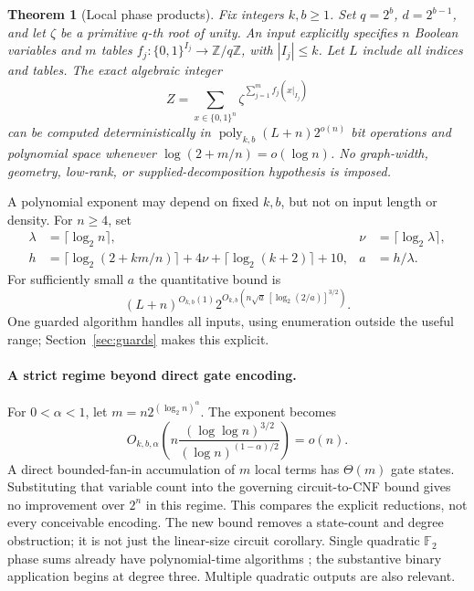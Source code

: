 \documentclass[11pt,a4paper]{article}
\newtheorem{theorem}{Theorem}[section]
\theoremstyle{remark}\newtheorem{remark}[theorem]{Remark}
\newcommand{\F}{\mathbb F}\newcommand{\Q}{\mathbb Q}\newcommand{\Z}{\mathbb Z}
\newcommand{\bits}{\{0,1\}}\newcommand{\poly}{\operatorname{poly}}
\begin{document}
\begin{theorem}[Local phase products]\label{thm:main}
Fix integers $k,b\ge1$. Set $q=2^b$, $d=2^{b-1}$, and let $\zeta$ be a
primitive $q$-th root of unity. An input explicitly specifies $n$ Boolean
variables and $m$ tables $f_j:\bits^{I_j}\to\Z/q\Z$, with $|I_j|\le k$.
Let $L$ include all indices and tables. The exact algebraic integer
\[
 Z=\sum_{x\in\bits^n}\zeta^{\sum_{j=1}^m f_j(x|_{I_j})}
\]
can be computed deterministically in $\poly_{k,b}(L+n)2^{o(n)}$ bit
operations and polynomial space whenever
$\log(2+m/n)=o(\log n)$.
No graph-width, geometry, low-rank, or supplied-decomposition hypothesis
is imposed.
\end{theorem}

A polynomial exponent may depend on fixed $k,b$, but not on input
length or density. For $n\ge4$, set
\begin{align*}
 \lambda&=\lceil\log_2n\rceil,&\nu&=\lceil\log_2\lambda\rceil,\\
 h&=\lceil\log_2(2+km/n)\rceil+4\nu+\lceil\log_2(k+2)\rceil+10,
 &a&=h/\lambda.
\end{align*}
For sufficiently small $a$ the quantitative bound is
\begin{equation}\label{eq:time}
 (L+n)^{O_{k,b}(1)}
 2^{O_{k,b}\left(n\sqrt a\,[\log_2(2/a)]^{3/2}\right)}.
\end{equation}
One guarded algorithm handles all inputs, using enumeration outside the
useful range; Section~\ref{sec:guards} makes this explicit.

\paragraph{A strict regime beyond direct gate encoding.}
For $0<\alpha<1$, let $m=n2^{(\log_2n)^\alpha}$. The exponent becomes
\[
 O_{k,b,\alpha}\!\left(
 n\frac{(\log\log n)^{3/2}}{(\log n)^{(1-\alpha)/2}}\right)=o(n).
\]
A direct bounded-fan-in accumulation of $m$ local terms has
$\Theta(m)$ gate states. Substituting that variable count into the
governing circuit-to-CNF bound gives no improvement over $2^n$ in this
regime. This compares the explicit reductions, not every conceivable
encoding. The new bound removes a state-count and degree obstruction;
it is not just the linear-size circuit corollary. Single quadratic
$\F_2$ phase sums already have polynomial-time algorithms
\cite{williams2018}; the substantive binary application begins at degree
three. Multiple quadratic outputs are also relevant.
\end{document}
